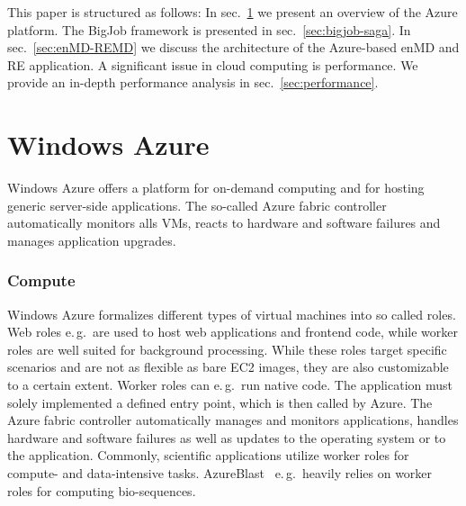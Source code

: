 \documentclass[conference,final]{IEEEtran}
\newcommand{\up}{\vspace*{-1em}}
\newcommand{\alnote}[1]{ {\textcolor{blue} { ***AL: #1 }}}
\newcommand{\jhanote}[1]{ {\textcolor{red} { ***SJ: #1 }}}
\newcommand{\alnote}[1]{}
\newcommand{\jhanote}[1]{}
\begin{document}
This paper is structured as follows: In sec.~\ref{sec:azure} we
present an overview of the Azure platform. The BigJob framework 
is presented in sec.~\ref{sec:bigjob-saga}. In sec.~\ref{sec:enMD-REMD} we
discuss the architecture of the Azure-based enMD and RE application.
A significant issue in cloud computing is performance. We provide an
in-depth performance analysis in sec.~\ref{sec:performance}.



\up
\section{Windows Azure}
\label{sec:azure}
\up
Windows Azure offers a platform for on-demand computing and
for hosting generic server-side applications. The so-called Azure
fabric controller automatically monitors alls VMs, 
reacts to hardware and software failures and manages application
upgrades.

\subsubsection{Compute}

Windows Azure formalizes different types of virtual machines into
so called roles. Web roles e.\,g.\ are used to host web applications
and frontend code, while worker roles are well suited for background
processing. While these roles target specific scenarios and are not
as flexible as bare EC2 images, they are also customizable to
a certain extent. Worker roles can e.\,g.\ run native code. The
application must solely implemented a defined entry point, which is
then called by Azure. The Azure fabric controller automatically
manages and monitors applications, handles hardware and software
failures as well as updates to the operating system or to the
application.  Commonly, scientific applications utilize worker roles
for compute- and data-intensive tasks. AzureBlast~\cite{azure_blast}
e.\,g.\ heavily relies on worker roles for computing bio-sequences.
\end{document}
